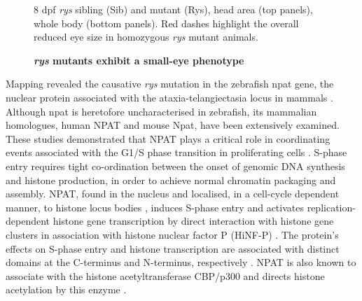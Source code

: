\documentclass{ut-thesis}
\begin{document}
\begin{NoHyper}
\begin{figure}[!h]
    \caption{{\bf \textit{rys} mutants exhibit a small-eye phenotype}}
    \label{ryspic}
    8 dpf \textit{rys} sibling (Sib) and mutant (Rys), head area (top panels), whole body (bottom panels). Red dashes highlight the overall reduced eye size in homozygous \textit{rys} mutant animals.
\end{figure}

Mapping revealed the causative \textit{rys} mutation in the zebrafish npat gene, the nuclear protein associated with the ataxia-telangiectasia locus in mammals \cite{Imai1996}. Although npat is heretofore uncharacterised in zebrafish, its mammalian homologues, human NPAT and mouse Npat, have been extensively examined. These studies demonstrated that NPAT plays a critical role in coordinating events associated with the G1/S phase transition in proliferating cells \cite{Ye2003}. S-phase entry requires tight co-ordination between the onset of genomic DNA synthesis and histone production, in order to achieve normal chromatin packaging and assembly. NPAT, found in the nucleus \cite{Sagara2002} and localised, in a cell-cycle dependent manner, to histone locus bodies \cite{Ghule2009}, induces S-phase entry \cite{Zhao1998} and activates replication-dependent histone gene transcription by direct interaction with histone gene clusters \cite{Zhao2000} in association with histone nuclear factor P (HiNF-P) \cite{Mitra2003}. The protein’s effects on S-phase entry and histone transcription are associated with distinct domains at the C-terminus and N-terminus, respectively \cite{Wei2003}. NPAT is also known to associate with the histone acetyltransferase CBP/p300 \cite{Wang2004} and directs histone acetylation by this enzyme \cite{He2011}.


\end{NoHyper}
\end{document}
